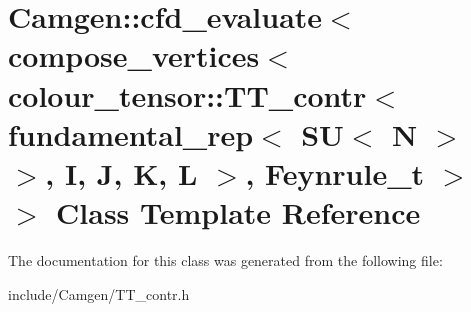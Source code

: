 \hypertarget{a00062}{\section{Camgen\-:\-:cfd\-\_\-evaluate$<$ compose\-\_\-vertices$<$ colour\-\_\-tensor\-:\-:T\-T\-\_\-contr$<$ fundamental\-\_\-rep$<$ S\-U$<$ N $>$ $>$, I, J, K, L $>$, Feynrule\-\_\-t $>$ $>$ Class Template Reference}
\label{a00062}
}


The documentation for this class was generated from the following file\-:\begin{DoxyCompactItemize}
\item 
include/\-Camgen/T\-T\-\_\-contr.\-h\end{DoxyCompactItemize}
